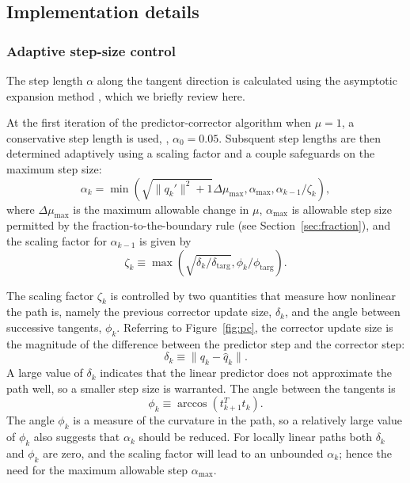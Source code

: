 \subsection{Implementation details}

\subsubsection{Adaptive step-size control}\label{sec:step}

The step length $\alpha$ along the tangent direction is calculated using the
asymptotic expansion method \cite{allgower3}, which we briefly review here.

At the first iteration of the predictor-corrector algorithm when $\mu=1$, a
conservative step length is used, \eg, $\alpha_0 = 0.05$.  Subsquent step
lengths are then determined adaptively using a scaling factor and a couple
safeguards on the maximum step size:
\begin{equation*}
  \alpha_{k} = \min\left( \sqrt{\|q_{k}'\|^2 + 1}\Delta \mu_{\max}, \alpha_{\max}, \alpha_{k-1}/\zeta_{k} \right),
\end{equation*}
where $\Delta \mu_{\max}$ is the maximum allowable change in $\mu$,
$\alpha_{\max}$ is allowable step size permitted by the fraction-to-the-boundary
rule (see Section~\ref{sec:fraction}), and the scaling factor for $\alpha_{k-1}$ is given by
\begin{equation*}
  \zeta_{k} \equiv \max\left( \sqrt{\delta_k/\delta_{\text{targ}}}, \phi_k / \phi_{\text{targ}} \right).
\end{equation*}

The scaling factor $\zeta_k$ is controlled by two quantities that measure how
nonlinear the path is, namely the previous corrector update size, $\delta_k$, and the angle
between successive tangents, $\phi_k$.  Referring to Figure~\ref{fig:pc}, the corrector
update size is the magnitude of the difference between the predictor step and
the corrector step:
\begin{equation}\label{eq:delta_k}
  \delta_k \equiv \| q_{k} - \hat{q}_{k} \|.
\end{equation}
A large value of $\delta_k$ indicates that the linear predictor does not
approximate the path well, so a smaller step size is warranted.  The angle
between the tangents is
\begin{equation}\label{eq:phi_k}
  \phi_k \equiv \arccos\left(t_{k+1}^T t_{k} \right).
\end{equation}
The angle $\phi_k$ is a measure of the curvature in the path, so a relatively
large value of $\phi_k$ also suggests that $\alpha_k$ should be reduced.  For
locally linear paths both $\delta_k$ and $\phi_k$ are zero, and the scaling
factor will lead to an unbounded $\alpha_k$; hence the need for the maximum
allowable step $\alpha_{\max}$.

